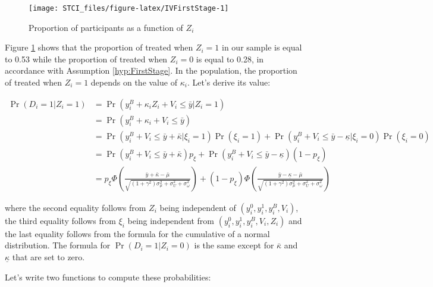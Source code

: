 \documentclass[
]{book}
\theoremstyle{definition}
\theoremstyle{definition}
\theoremstyle{definition}
\theoremstyle{definition}
\theoremstyle{remark}
\begin{document}
\begin{figure}[htbp]

{\centering \texttt{[image: STCI\_files/figure-latex/IVFirstStage-1]} 

}

\caption{Proportion of participants as a function of $Z_i$}\label{fig:IVFirstStage}
\end{figure}

Figure \ref{fig:IVFirstStage} shows that the proportion of treated when \(Z_i=1\) in our sample is equal to 0.53 while the proportion of treated when \(Z_i=0\) is equal to 0.28, in accordance with Assumption \ref{hyp:FirstStage}.
In the population, the proportion of treated when \(Z_i=1\) depends on the value of \(\kappa_i\).
Let's derive its value:

\begin{align*}
  \Pr(D_i=1|Z_i=1) & = \Pr(y_i^B+\kappa_i Z_i + V_i\leq\bar{y}|Z_i=1) \\
                  & =  \Pr(y_i^B+\kappa_i + V_i\leq\bar{y}) \\
                  & =  \Pr(y_i^B+ V_i\leq\bar{y}+\bar{\kappa}|\xi_i=1)\Pr(\xi_i=1) + \Pr(y_i^B+V_i\leq\bar{y}-\underline{\kappa}|\xi_i=0)\Pr(\xi_i=0) \\
                                    & =  \Pr(y_i^B+ V_i\leq\bar{y}+\bar{\kappa})p_{\xi} + \Pr(y_i^B+ V_i\leq\bar{y}-\underline{\kappa})(1-p_{\xi}) \\
                  & =  p_{\xi}\Phi\left(\frac{\bar{y}+\bar{\kappa}-\bar{\mu}}{\sqrt{(1+\gamma^2)\sigma^2_{\mu}+\sigma^2_{U}+\sigma^2_{\omega}}}\right) + (1-p_{\xi})\Phi\left(\frac{\bar{y}-\underline{\kappa}-\bar{\mu}}{\sqrt{(1+\gamma^2)\sigma^2_{\mu}+\sigma^2_{U}+\sigma^2_{\omega}}}\right)
\end{align*}

where the second equality follows from \(Z_i\) being independent of \((y_i^0,y_i^1,y_i^B,V_i)\), the third equality follows from \(\xi_i\) being independent from \((y_i^0,y_i^1,y_i^B,V_i,Z_i)\) and the last equality follows from the formula for the cumulative of a normal distribution.
The formula for \(\Pr(D_i=1|Z_i=0)\) is the same except for \(\bar{\kappa}\) and \(\underline{\kappa}\) that are set to zero.

Let's write two functions to compute these probabilities:
\end{document}
